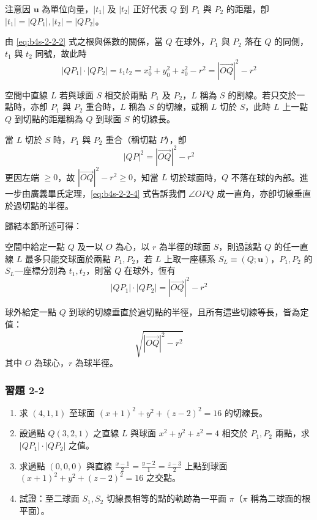 注意因 $\mathbf{u}$ 為單位向量，$|t_1|$ 及 $|t_2|$ 正好代表 $Q$ 到 $P_1$ 與 $P_2$ 的距離，卽 $|t_1| = |QP_1|, |t_2| = |QP_2|$。

由 \eqref{eq:b4s-2-2-2} 式之根與係數的關係，當 $Q$ 在球外，$P_1$ 與 $P_2$ 落在 $Q$ 的同側，$t_1$ 與 $t_2$ 同號，故此時
\begin{equation}
|QP_1| \cdot |QP_2| = t_1 t_2 = x_0^2 + y_0^2 + z_0^2 - r^2 = |\vec{OQ}|^2 - r^2 \label{eq:b4s-2-2-3}
\end{equation}

\begin{definition}[定義]
空間中直線 $L$ 若與球面 $S$ 相交於兩點 $P_1$ 及 $P_2$，$L$ 稱為 $S$ 的割線。若只交於一點時，亦卽 $P_1$ 與 $P_2$ 重合時，$L$ 稱為 $S$ 的切線，或稱 $L$ 切於 $S$，此時 $L$ 上一點 $Q$ 到切點的距離稱為 $Q$ 到球面 $S$ 的切線長。
\end{definition}

當 $L$ 切於 $S$ 時，$P_1$ 與 $P_2$ 重合（稱切點 $P$），卽
\begin{equation}
|QP|^2 = |\vec{OQ}|^2 - r^2 \label{eq:b4s-2-2-4}
\end{equation}
更因左端 $\ge 0$，故 $|\vec{OQ}|^2 - r^2 \ge 0$，知當 $L$ 切於球面時，$Q$ 不落在球的內部。進一步由廣義畢氏定理，\eqref{eq:b4s-2-2-4} 式告訴我們 $\angle OPQ$ 成一直角，亦卽切線垂直於過切點的半徑。

歸結本節所述可得：

\begin{theorem}[定理 1（球的割線定理）]
空間中給定一點 $Q$ 及一以 $O$ 為心，以 $r$ 為半徑的球面 $S$，則過該點 $Q$ 的任一直線 $L$ 最多只能交球面於兩點 $P_1, P_2$，若 $L$ 上取一座標系 $S_L \equiv (Q; \mathbf{u})$，$P_1, P_2$ 的 $S_L$---座標分別為 $t_1, t_2$，則當 $Q$ 在球外，恆有
\[ |QP_1| \cdot |QP_2| = |\vec{OQ}|^2 - r^2 \]
\end{theorem}

\begin{theorem}[定理 1'（球的切線長定理）]
球外給定一點 $Q$ 到球的切線垂直於過切點的半徑，且所有這些切線等長，皆為定值：
\[ \sqrt{|\vec{OQ}|^2 - r^2} \]
其中 $O$ 為球心，$r$ 為球半徑。
\end{theorem}

\subsubsection*{習題 2-2}
\begin{enumerate}
  \item 求 $(4, 1, 1)$ 至球面 $(x+1)^2 + y^2 + (z-2)^2 = 16$ 的切線長。
  \item 設過點 $Q(3, 2, 1)$ 之直線 $L$ 與球面 $x^2 + y^2 + z^2 = 4$ 相交於 $P_1, P_2$ 兩點，求 $|QP_1| \cdot |QP_2|$ 之值。
  \item 求過點 $(0, 0, 0)$ 與直線 $\frac{x-1}{2} = \frac{y-2}{1} = \frac{z-3}{2}$ 上點到球面 $(x+1)^2 + y^2 + (z-2)^2 = 16$ 之交點。
  \item 試證：至二球面 $S_1, S_2$ 切線長相等的點的軌跡為一平面 $\pi$（$\pi$ 稱為二球面的根平面）。
\end{enumerate}


